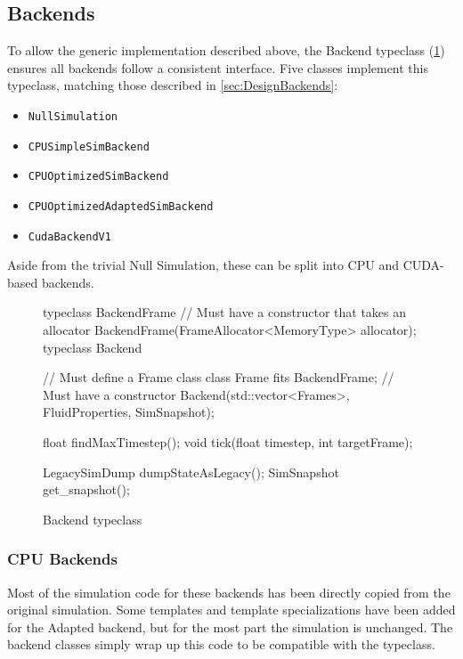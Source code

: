 \subsection{Backends}
To allow the generic implementation described above, the Backend typeclass (\cref{fig:TypeclassBackend}) ensures all backends follow a consistent interface.
Five classes implement this typeclass, matching those described in \cref{sec:DesignBackends}:
\begin{itemize}
    \item \texttt{NullSimulation}
    \item \texttt{CPUSimpleSimBackend}
    \item \texttt{CPUOptimizedSimBackend}
    \item \texttt{CPUOptimizedAdaptedSimBackend}
    \item \texttt{CudaBackendV1}
\end{itemize}
Aside from the trivial Null Simulation, these can be split into CPU and CUDA-based backends.

\begin{figure}
    \centering
\begin{cppcode}
typeclass BackendFrame {
    // Must have a constructor that takes an allocator
    BackendFrame(FrameAllocator<MemoryType> allocator);
}
typeclass Backend {
    // Must define a Frame class
    class Frame fits BackendFrame;
    // Must have a constructor
    Backend(std::vector<Frames>, FluidProperties, SimSnapshot);
    
    float findMaxTimestep();
    void tick(float timestep, int targetFrame);
    
    LegacySimDump dumpStateAsLegacy();
    SimSnapshot get_snapshot();
}    
\end{cppcode}
    \caption{Backend typeclass}
    \label{fig:TypeclassBackend}
\end{figure}

\subsubsection{CPU Backends}
Most of the simulation code for these backends has been directly copied from the original simulation\cite{modules:CS257Coursework}\cite{modules:aca257submission}.
Some templates and template specializations have been added for the Adapted backend, but for the most part the simulation is unchanged.
The backend classes simply wrap up this code to be compatible with the typeclass.

